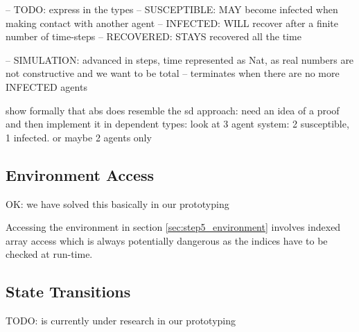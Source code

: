 -- TODO: express in the types
-- SUSCEPTIBLE: MAY become infected when making contact with another agent
-- INFECTED:    WILL recover after a finite number of time-steps
-- RECOVERED:   STAYS recovered all the time

-- SIMULATION:  advanced in steps, time represented as Nat, as real numbers are not constructive and we want to be total
--              terminates when there are no more INFECTED agents


show formally that abs does resemble the sd approach: need an idea of a proof and then implement it in dependent types: look at 3 agent system: 2 susceptible, 1 infected. or maybe 2 agents only

%
%
%
%

\subsection{Environment Access}
OK: we have solved this basically in our prototyping

Accessing the environment in section \ref{sec:step5_environment} involves indexed array access which is always potentially dangerous as the indices have to be checked at run-time. 

\subsection{State Transitions}
TODO: is currently under research in our prototyping

